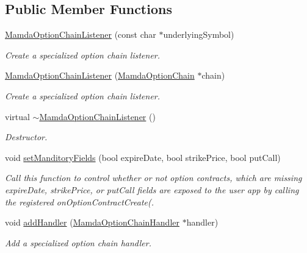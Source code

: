 \subsection*{Public Member Functions}
\begin{CompactItemize}
\item 
\hyperlink{classWombat_1_1MamdaOptionChainListener_ed246a918ce9f7f820daf0fedac8c540}{Mamda\-Option\-Chain\-Listener} (const char $\ast$underlying\-Symbol)
\begin{CompactList}\small\item\em Create a specialized option chain listener. \item\end{CompactList}\item 
\hyperlink{classWombat_1_1MamdaOptionChainListener_34b3a4c1ef0cb23d98863c5852d3657f}{Mamda\-Option\-Chain\-Listener} (\hyperlink{classWombat_1_1MamdaOptionChain}{Mamda\-Option\-Chain} $\ast$chain)
\begin{CompactList}\small\item\em Create a specialized option chain listener. \item\end{CompactList}\item 
virtual \hyperlink{classWombat_1_1MamdaOptionChainListener_3417b532649e5cba25f53cb9b3c46c30}{$\sim$Mamda\-Option\-Chain\-Listener} ()
\begin{CompactList}\small\item\em Destructor. \item\end{CompactList}\item 
void \hyperlink{classWombat_1_1MamdaOptionChainListener_8fb40267dabfb52a3bc1ae63e10f84e5}{set\-Manditory\-Fields} (bool expire\-Date, bool strike\-Price, bool put\-Call)
\begin{CompactList}\small\item\em Call this function to control whether or not option contracts, which are missing expire\-Date, strike\-Price, or put\-Call fields are exposed to the user app by calling the registered on\-Option\-Contract\-Create(. \item\end{CompactList}\item 
void \hyperlink{classWombat_1_1MamdaOptionChainListener_1f3d13c81de522368bf30257965e87ea}{add\-Handler} (\hyperlink{classWombat_1_1MamdaOptionChainHandler}{Mamda\-Option\-Chain\-Handler} $\ast$handler)
\begin{CompactList}\small\item\em Add a specialized option chain handler. \item\end{CompactList}\item 

\end{CompactItemize}

